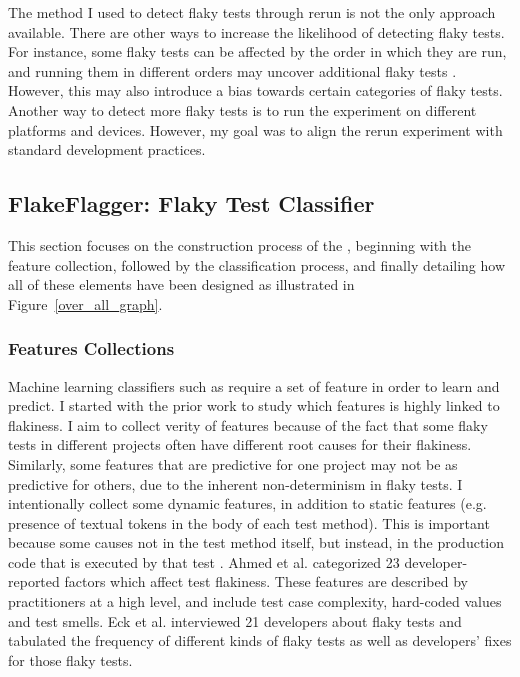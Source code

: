 The method I used to detect flaky tests through rerun is not the only approach available. There are other ways to increase the likelihood of detecting flaky tests. For instance, some flaky tests can be affected by the order in which they are run, and running them in different orders may uncover additional flaky tests \cite{lam2019idflakies}. However, this may also introduce a bias towards certain categories of flaky tests. Another way to detect more flaky tests is to run the experiment on different platforms and devices. However, my goal was to align the rerun experiment with standard development practices.


\subsection{FlakeFlagger: Flaky Test Classifier}
\label{sec:flakeFlaggerClassifier}

This section focuses on the construction process of the \sysName, beginning with the feature collection, followed by the classification process, and finally detailing how all of these elements have been designed as illustrated in Figure~\ref{over_all_graph}.







\subsubsection{Features Collections}
\label{sec:detector}
Machine learning classifiers such as \sysName require a set of feature in order to learn and predict. I started with the prior work \cite{luo2014empirical,eck2019understanding,bell2018deflaker} to study which features is highly linked to flakiness. I aim to collect verity of features because of the fact that some flaky tests in different projects often have different root causes for their flakiness\cite{luo2014empirical}. Similarly, some features that are predictive for one project may not be as predictive for others, due to the inherent non-determinism in flaky tests. 
I intentionally collect some dynamic features, in addition to static features (e.g. presence of textual tokens in the body of each test method). This is important because some causes not in the test method itself, but instead, in the production code that is executed by that test \cite{eck2019understanding}.
Ahmed et al. \cite{ahmad2021empirical} categorized 23 developer-reported factors which affect test flakiness. 
These features are described by practitioners at a high level, and include test case complexity, hard-coded values and test smells.
Eck et al. \cite{eck2019understanding} interviewed 21 developers about flaky tests and tabulated the frequency of different kinds of flaky tests as well as developers' fixes for those flaky tests. 



